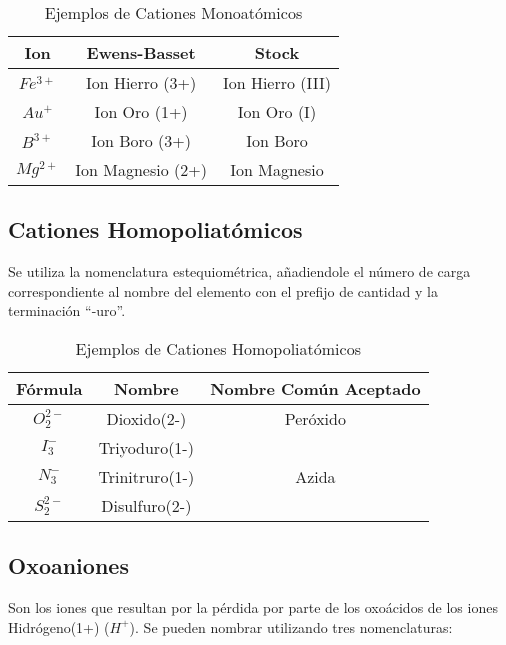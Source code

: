 \begin{table}[h!]
	\centering\begin{tabular}{c|cc}
		Ion&Ewens-Basset&Stock \\ \hline
		$Fe^{3+}$&Ion Hierro (3+)&Ion Hierro (III)\\
		$Au^{+}$&Ion Oro (1+)&Ion Oro (I)\\
		$B^{3+}$&Ion Boro (3+)&Ion Boro\\
		$Mg^{2+}$&Ion Magnesio (2+)&Ion Magnesio \\ \hline
	\end{tabular}
	\caption{Ejemplos de Cationes Monoatómicos}
\end{table}
\subsection{Cationes Homopoliatómicos}
Se utiliza la nomenclatura estequiométrica, añadiendole el número de carga correspondiente al nombre del elemento con el prefijo de cantidad y la terminación “-uro”.
\begin{table}[h!]
	\centering
	\begin{tabular}{c|cc}
		Fórmula&Nombre&Nombre Común Aceptado\\ \hline
		$O_{2}^{2-}$&Dioxido(2-)&Peróxido\\
		$I_{3}^{-}$&Triyoduro(1-)&\\
		$N_{3}^{-}$&Trinitruro(1-)&Azida\\
		$S_{2}^{2-}$&Disulfuro(2-)&\\ \hline
	\end{tabular}
		\caption{Ejemplos de Cationes Homopoliatómicos}
\end{table}

\subsection{Oxoaniones}
Son los iones que resultan por la pérdida por parte de los oxoácidos de los iones Hidrógeno(1+) ($H^{+}$). Se pueden nombrar utilizando tres nomenclaturas:\\

